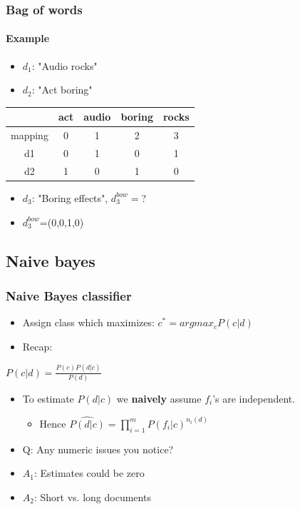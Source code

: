\documentclass{beamer}
\begin{document}
\begin{frame}
	\frametitle{Bag of words}
	\framesubtitle{Example}
	\begin{itemize}
		\item $d_1$: "Audio rocks"
		\item $d_2$: "Act boring"
	\end{itemize}
	\begin{center}
	\begin{table}
		\begin{tabular}{c|c|c|c|c}
			& act & audio & boring & rocks \\ \hline \hline
			mapping & 0 & 1 & 2 & 3 \\ \hline
			d1 & 0 & 1 & 0 & 1 \\
			d2 & 1 & 0 & 1 & 0
		\end{tabular}
	\end{table}
	\end{center}
	
	\begin{itemize}
		\item $d_3$: "Boring effects", $d_3^{bow}=$? \pause
		\item $d_3^{bow}$=(0,0,1,0)
	\end{itemize}
\end{frame}

\subsection{Naive bayes}
\begin{frame}
	\frametitle{Naive Bayes classifier}
	\begin{itemize}
		\item Assign class which maximizes: $c^{*}=argmax_{c} P(c|d)$
		\pause
		\item Recap:
	\end{itemize}
	
	\begin{Definition}
		\center
		$P(c|d) = \frac{P(c)P(d|c)}{P(d)}$
	\end{Definition}
	\pause
	\begin{itemize}
		\item To estimate $P(d|c)$ we \textbf{naively} assume $f_i$'s are independent.
		\pause
		\begin{itemize}
			\item Hence $\widehat{P(d|c)}=\prod_{i=1}^{m}P(f_i|c)^{n_i(d)}$ 
		\end{itemize}
		\pause
		\item Q: Any numeric issues you notice?
		\pause
		\item $A_1$: Estimates could be zero
		\pause
		\item $A_2$: Short vs. long documents
	\end{itemize}
\end{frame}
\end{document}
